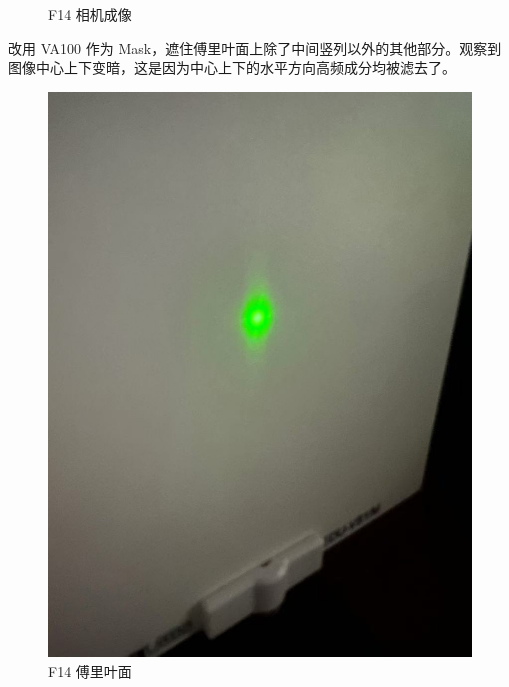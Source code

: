 \documentclass{ctexart}
\begin{document}
\begin{figure}[H]
\begin{minipage}[b]{0.3\textwidth}
    \caption{F14 相机成像}
  \end{minipage}
\end{figure}

改用 VA100 作为 Mask，遮住傅里叶面上除了中间竖列以外的其他部分。观察到图像中心上下变暗，这是因为中心上下的水平方向高频成分均被滤去了。
\begin{figure}[H]
  \centering
  \begin{minipage}[b]{0.2\textwidth}
    \centering
    \includegraphics[width=\textwidth]{pictures/微信图片_20241017164911.jpg}
    \caption{F14 傅里叶面}
  \end{minipage}
  \hspace{0.1\textwidth} %
  \begin{minipage}[b]{0.3\textwidth}
    \centering

\end{minipage}
\end{figure}
\end{document}
